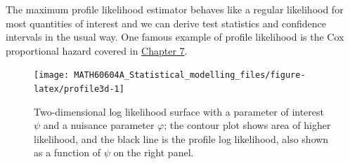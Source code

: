 \documentclass[
  11pt,
  letterpaper,
]{book}
\theoremstyle{definition}
\theoremstyle{definition}
\theoremstyle{definition}
\theoremstyle{remark}
\begin{document}
The maximum profile likelihood estimator behaves like a regular likelihood for most quantities of interest and we can derive test statistics and confidence intervals in the usual way. One famous example of profile likelihood is the Cox proportional hazard covered in \protect\hyperlink{survival}{Chapter 7}.

\begin{figure}

{\centering \texttt{[image: MATH60604A\_Statistical\_modelling\_files/figure-latex/profile3d-1]} 

}

\caption{Two-dimensional log likelihood surface with a parameter of interest $\psi$ and a nuisance parameter $\varphi$; the contour plot shows area of higher likelihood, and the black line is the profile log likelihood, also shown as a function of $\psi$ on the right panel.}\label{fig:profile3d}
\end{figure}
\end{document}

